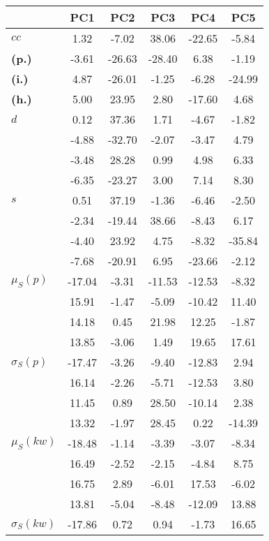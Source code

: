 \begin{table}[h!]
\begin{center}
\begin{tabular}{| l || c | c | c | c | c |}\hline
 & {\bf PC1} & {\bf PC2} & {\bf PC3} & {\bf PC4} & {\bf PC5} \\\hline\hline
{\bf $cc$} & 1.32 & -7.02 & 38.06 & -22.65 & -5.84 \\
{\bf (p.)} & -3.61 & -26.63 & -28.40 & 6.38 & -1.19 \\
{\bf (i.)} & 4.87 & -26.01 & -1.25 & -6.28 & -24.99 \\
{\bf (h.)} & 5.00 & 23.95 & 2.80 & -17.60 & 4.68 \\\hline
{\bf $d$} & 0.12 & 37.36 & 1.71 & -4.67 & -1.82 \\
{\bf } & -4.88 & -32.70 & -2.07 & -3.47 & 4.79 \\
{\bf } & -3.48 & 28.28 & 0.99 & 4.98 & 6.33 \\
{\bf } & -6.35 & -23.27 & 3.00 & 7.14 & 8.30 \\\hline
{\bf $s$} & 0.51 & 37.19 & -1.36 & -6.46 & -2.50 \\
{\bf } & -2.34 & -19.44 & 38.66 & -8.43 & 6.17 \\
 & -4.40  & 23.92  & 4.75  & -8.32  & -35.84 \\
 & -7.68  & -20.91  & 6.95  & -23.66  & -2.12 \\\hline
$\mu_S(p)$ & -17.04  & -3.31  & -11.53  & -12.53  & -8.32 \\
 & 15.91  & -1.47  & -5.09  & -10.42  & 11.40 \\
 & 14.18  & 0.45  & 21.98  & 12.25  & -1.87 \\
 & 13.85  & -3.06  & 1.49  & 19.65  & 17.61 \\\hline
$\sigma_S(p)$ & -17.47  & -3.26  & -9.40  & -12.83  & 2.94 \\
 & 16.14  & -2.26  & -5.71  & -12.53  & 3.80 \\
 & 11.45  & 0.89  & 28.50  & -10.14  & 2.38 \\
 & 13.32  & -1.97  & 28.45  & 0.22  & -14.39 \\\hline
$\mu_S(kw)$ & -18.48  & -1.14  & -3.39  & -3.07  & -8.34 \\
 & 16.49  & -2.52  & -2.15  & -4.84  & 8.75 \\
 & 16.75  & 2.89  & -6.01  & 17.53  & -6.02 \\
 & 13.81  & -5.04  & -8.48  & -12.09  & 13.88 \\\hline
$\sigma_S(kw)$ & -17.86  & 0.72  & 0.94  & -1.73  & 16.65 \\

\end{tabular}
\end{center}
\end{table}
